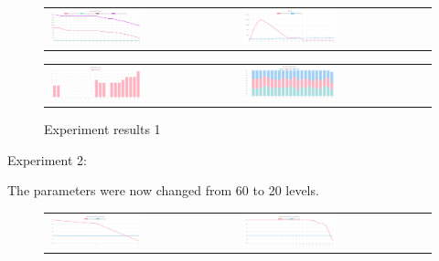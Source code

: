 \begin{figure}[htbp]
\begin{tabular}{ll}
    \centering
    \includegraphics[width=0.5\textwidth]{007_team_4_agent_design/figures/EX1_3.jpg}
    &
    \includegraphics[width=0.5\textwidth]{007_team_4_agent_design/figures/EX1_4.jpg}
\end{tabular}
     
\end{figure}


\begin{figure}[htbp]
\begin{tabular}{ll}
    \centering
    \includegraphics[width=0.5\textwidth]{007_team_4_agent_design/figures/EX1_5.jpg}
    &
    \includegraphics[width=0.5\textwidth]{007_team_4_agent_design/figures/EX1_6.jpg}
\end{tabular}
    \caption{Experiment results 1}
\end{figure}

\newpage

Experiment 2:
\par The parameters were now changed from 60 to 20 levels.

\begin{figure}[htbp]
\begin{tabular}{ll}
    \centering
    \includegraphics[width=0.5\textwidth]{007_team_4_agent_design/figures/EX2_1.jpg}
    &
    \includegraphics[width=0.5\textwidth]{007_team_4_agent_design/figures/EX2_2.jpg}
\end{tabular}

\end{figure}

